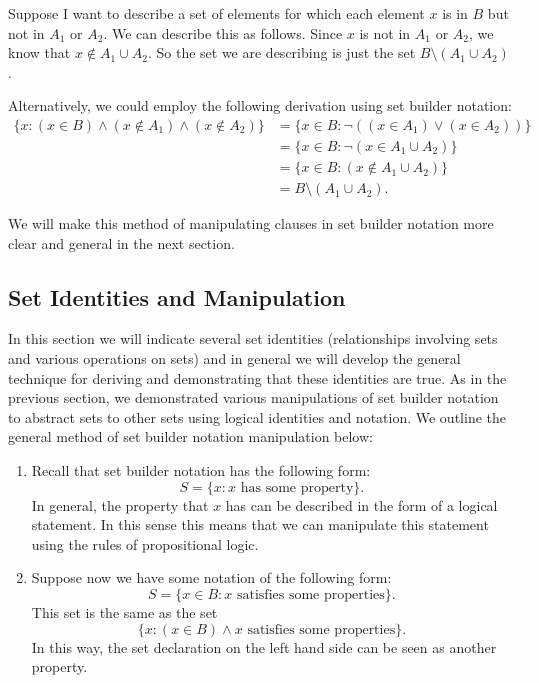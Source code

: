 \begin{example}
Suppose I want to describe a set of elements for which each element $x$ is in $B$ but not in $A_1$ or $A_2$. We can describe this as follows. Since $x$ is not in $A_1$ or $A_2$, we know that $x \not\in A_1 \cup A_2$. So the set we are describing is just the set $B \setminus (A_1 \cup A_2)$.

Alternatively, we could employ the following derivation using set builder notation:
\begin{align*}
	\{x \colon (x \in B) \land (x \not\in A_1) \land (x \not\in A_2)\} &= \{x \in B \colon \lnot((x \in A_1) \lor (x \in A_2))\} \\ 
	&= \{x \in B \colon \lnot(x \in A_1 \cup A_2)\} \\
	&= \{x \in B \colon (x \not\in A_1 \cup A_2)\} \\
	&= B \setminus (A_1 \cup A_2).
\end{align*}

We will make this method of manipulating clauses in set builder notation more clear and general in the next section.
\end{example}

\subsection{Set Identities and Manipulation}

In this section we will indicate several set identities (relationships involving sets and various operations on sets) and in general we will develop the general technique for deriving and demonstrating that these identities are true. As in the previous section, we demonstrated various manipulations of set builder notation to abstract sets to other sets using logical identities and notation. We outline the general method of set builder notation manipulation below:

\begin{enumerate}
	\item Recall that set builder notation has the following form:
	\[S = \{\text{$x$} \colon \text{$x$ has some property}\}.\]
	In general, the property that $x$ has can be described in the form of a logical statement. In this sense this means that we can manipulate this statement using the rules of propositional logic.
	\item Suppose now we have some notation of the following form:
	\[S = \{x \in B \colon \text{$x$ satisfies some properties}\}.\]
	This set is the same as the set
	\[\{x \colon (x \in B) \land \text{$x$ satisfies some properties}\}.\]
	In this way, the set declaration on the left hand side can be seen as another property. 
\end{enumerate}

